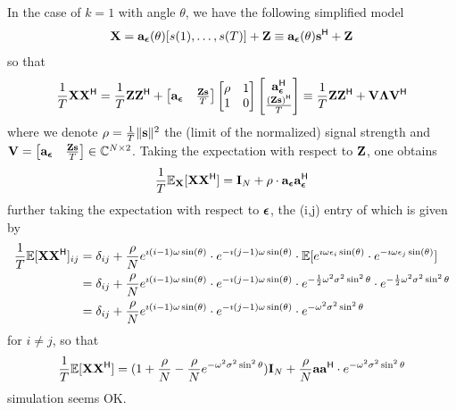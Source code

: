 \documentclass[11pt,a4paper]{article}
\begin{document}
In the case of $k=1$ with angle $\theta$, we have the following simplified model
\begin{equation}
	{\mathbf{X}} = \mathbf{a}_{{\boldsymbol{\epsilon}}}(\theta) [s(1), \ldots, s(T)] + {\mathbf{Z}} \equiv \mathbf{a}_{{\boldsymbol{\epsilon}}}(\theta) \mathbf{s}^{\sf H} + {\mathbf{Z}}
\end{equation}
so that 
\begin{equation}
	\frac1T {\mathbf{X}} {\mathbf{X}}^{\sf H} = \frac1T {\mathbf{Z}} {\mathbf{Z}}^{\sf H} + \begin{bmatrix}\mathbf{a}_{{\boldsymbol{\epsilon}}} & \frac{{\mathbf{Z}} \mathbf{s}}{T}\end{bmatrix} \begin{bmatrix} \rho & 1 \\ 1 & 0 \end{bmatrix} \begin{bmatrix}\mathbf{a}_{{\boldsymbol{\epsilon}}}^{\sf H} \\ \frac{({\mathbf{Z}} \mathbf{s})^{\sf H}}{T}\end{bmatrix} \equiv \frac1T {\mathbf{Z}} {\mathbf{Z}}^{\sf H} + \mathbf{V} \boldsymbol{\Lambda} \mathbf{V}^{\sf H}
\end{equation}
where we denote $\rho = \frac1T \| \mathbf{s} \|^2 $ the (limit of the normalized) signal strength and $\mathbf{V} = \begin{bmatrix}\mathbf{a}_{{\boldsymbol{\epsilon}}} & \frac{{\mathbf{Z}} \mathbf{s}}{T}\end{bmatrix} \in {\mathbb{C}}^{N \times 2}$. Taking the expectation with respect to ${\mathbf{Z}}$, one obtains
\begin{equation}
	\frac1T {\mathbb{E}}_{\mathbf{X}}[{\mathbf{X}} {\mathbf{X}}^{\sf H}] = \mathbf{I}_N + \rho \cdot \mathbf{a}_{{\boldsymbol{\epsilon}}} \mathbf{a}_{{\boldsymbol{\epsilon}}}^{\sf H}
\end{equation}
further taking the expectation with respect to ${\boldsymbol{\epsilon}}$, the (i,j) entry of which is given by
\begin{align}
	\frac1T {\mathbb{E}}[{\mathbf{X}} {\mathbf{X}}^{\sf H}]_{ij} &= \delta_{ij} + \frac{\rho}N e^{\imath (i-1) \omega \sin(\theta)} \cdot e^{-\imath (j-1) \omega \sin(\theta)} \cdot {\mathbb{E}} [e^{\imath \omega \epsilon_i \sin(\theta)} \cdot e^{-\imath \omega \epsilon_j \sin(\theta)}] \\ 
	& =\delta_{ij} + \frac{\rho}N e^{\imath (i-1) \omega \sin(\theta)} \cdot e^{-\imath (j-1) \omega \sin(\theta)} \cdot e^{-\frac12 \omega^2 \sigma^2 \sin^2 \theta} \cdot e^{-\frac12 \omega^2 \sigma^2 \sin^2 \theta} \\ 
	& = \delta_{ij} + \frac{\rho}N e^{\imath (i-1) \omega \sin(\theta)} \cdot e^{-\imath (j-1) \omega \sin(\theta)} \cdot e^{-\omega^2 \sigma^2 \sin^2 \theta}
\end{align}
for $i \neq j$, so that 
\begin{equation}
	\frac1T {\mathbb{E}}[{\mathbf{X}} {\mathbf{X}}^{\sf H}] = (1 +  \frac{\rho}N - \frac{\rho}N e^{- \omega^2 \sigma^2 \sin^2 \theta} ) \mathbf{I}_N + \frac{\rho}N \mathbf{a} \mathbf{a}^{\sf H} \cdot e^{-\omega^2 \sigma^2 \sin^2 \theta}
\end{equation}
{\BLUE simulation seems OK.}
\end{document}
